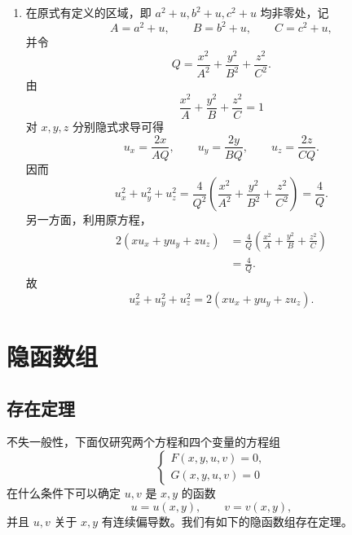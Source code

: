 \begin{xsolution}
\begin{enumerate}[label=(\arabic*)]
  \item 在原式有定义的区域，即 $a^2+u,b^2+u,c^2+u$ 均非零处，记
  \[
    A=a^2+u,\qquad B=b^2+u,\qquad C=c^2+u,
  \]
  并令
  \[
    Q=\frac{x^2}{A^2}+\frac{y^2}{B^2}+\frac{z^2}{C^2}.
  \]
  由
  \[
    \frac{x^2}{A}+\frac{y^2}{B}+\frac{z^2}{C}=1
  \]
  对 $x,y,z$ 分别隐式求导可得
  \[
    u_x=\frac{2x}{AQ},\qquad
    u_y=\frac{2y}{BQ},\qquad
    u_z=\frac{2z}{CQ}.
  \]
  因而
  \[
    u_x^2+u_y^2+u_z^2
    =\frac4{Q^2}
      \left(\frac{x^2}{A^2}+\frac{y^2}{B^2}+\frac{z^2}{C^2}\right)
    =\frac4Q.
  \]
  另一方面，利用原方程，
  \begin{align*}
    2(xu_x+yu_y+zu_z)
    &=\frac4Q\left(\frac{x^2}{A}+\frac{y^2}{B}+\frac{z^2}{C}\right)\\
    &=\frac4Q.
  \end{align*}
  故
  \[
    \boxed{u_x^2+u_y^2+u_z^2=2(xu_x+yu_y+zu_z)}.
  \]
\end{enumerate}
\end{xsolution}


\section{隐函数组}

\subsection{存在定理}

不失一般性，下面仅研究两个方程和四个变量的方程组
\[
  \begin{cases}
    F(x,y,u,v)=0,\\
    G(x,y,u,v)=0
  \end{cases}
\]
在什么条件下可以确定 $u,v$ 是 $x,y$ 的函数
\[
  u=u(x,y),\qquad v=v(x,y),
\]
并且 $u,v$ 关于 $x,y$ 有连续偏导数。我们有如下的隐函数组存在定理。

